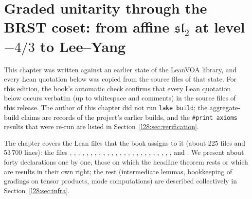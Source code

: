 \chapter[Graded unitarity through the BRST coset]{Graded unitarity through the BRST coset: from affine $\mathfrak{sl}_2$ at level $-4/3$ to Lee--Yang}\label{ch:L28}
\begingroup\setlength{\emergencystretch}{3em}\sloppy

\providecommand{\ltwentyeightsl}{\mathfrak{sl}_2}
\providecommand{\ltwentyeightvac}{\mathbf 1}
\providecommand{\ltwentyeightgr}{\operatorname{gr}}
\providecommand{\ltwentyeightGU}{\mathrm{GU}}
\providecommand{\ltwentyeightQ}{\mathbf Q}
\providecommand{\ltwentyeightLY}{L(-\tfrac{22}{5},0)}
\providecommand{\ltwentyeightA}{L_{-4/3}}
\providecommand{\ltwentyeightinv}{\operatorname{inv}}

This chapter was written against an earlier state of the LeanVOA library, and every Lean quotation below was
copied from the source files of that state. For this edition, the book's automatic check confirms that every Lean quotation below occurs verbatim (up to whitespace and comments) in the source files of this release. The author
of this chapter did not run \texttt{lake build}; the aggregate-build claims are records of the project's earlier builds, and the
\texttt{\#print axioms} results that were re-run are listed in Section~\ref{l28:sec:verification}.

The chapter covers the Lean files that the book assigns to it (about 225 files and 53\,700 lines):
the files ,
, , , ,
, , , ,
, , , ,
, , , ,
, , , , ,
,
, ,
 and . We present about forty declarations one by one,
those on which the headline theorem rests or which are results in their own right; the rest
(intermediate lemmas, bookkeeping of gradings on tensor products, mode computations) are described collectively in
Section~\ref{l28:sec:infra}.

